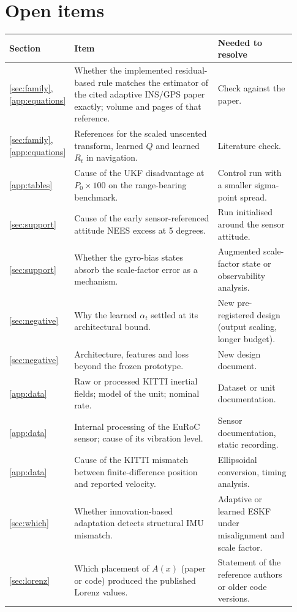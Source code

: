 \documentclass[11pt,a4paper]{article}
\begin{document}
\section{Open items}\label{app:open}
\begin{longtable}{p{0.1\linewidth}p{0.55\linewidth}p{0.28\linewidth}}
\toprule
Section & Item & Needed to resolve\\
\midrule\endhead
\ref{sec:family}, \ref{app:equations} & Whether the implemented residual-based rule matches the estimator of the cited adaptive
INS/GPS paper exactly; volume and pages of that reference. & Check against the paper.\\
\ref{sec:family}, \ref{app:equations} & References for the scaled unscented transform, learned $Q$ and learned $R_t$ in navigation. & Literature check.\\
\ref{app:tables} & Cause of the UKF disadvantage at $P_0\times100$ on the range-bearing benchmark. & Control run with a smaller sigma-point spread.\\
\ref{sec:support} & Cause of the early sensor-referenced attitude NEES excess at 5 degrees. & Run initialised around the sensor attitude.\\
\ref{sec:support} & Whether the gyro-bias states absorb the scale-factor error as a mechanism. & Augmented scale-factor state or observability analysis.\\
\ref{sec:negative} & Why the learned $\alpha_t$ settled at its architectural bound. & New pre-registered design (output scaling, longer budget).\\
\ref{sec:negative} & Architecture, features and loss beyond the frozen prototype. & New design document.\\
\ref{app:data} & Raw or processed KITTI inertial fields; model of the unit; nominal rate. & Dataset or unit documentation.\\
\ref{app:data} & Internal processing of the EuRoC sensor; cause of its vibration level. & Sensor documentation, static recording.\\
\ref{app:data} & Cause of the KITTI mismatch between finite-difference position and reported velocity. & Ellipsoidal conversion, timing analysis.\\
\ref{sec:which} & Whether innovation-based adaptation detects structural IMU mismatch. & Adaptive or learned ESKF under misalignment and scale factor.\\
\ref{sec:lorenz} & Which placement of $A(x)$ (paper or code) produced the published Lorenz values. & Statement of the reference authors or older code versions.\\

\end{longtable}
\end{document}

